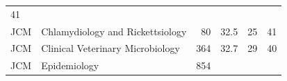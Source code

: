 \documentclass[11pt,]{article}
\begin{document}
\begin{longtable}[]{@{}llrrrr@{}}
\begin{minipage}[t]{0.11\columnwidth}
41\strut
\end{minipage}\tabularnewline
\begin{minipage}[t]{0.06\columnwidth}\raggedright\strut
JCM\strut
\end{minipage} & \begin{minipage}[t]{0.43\columnwidth}\raggedright\strut
Chlamydiology and Rickettsiology\strut
\end{minipage} & \begin{minipage}[t]{0.04\columnwidth}\raggedleft\strut
80\strut
\end{minipage} & \begin{minipage}[t]{0.08\columnwidth}\raggedleft\strut
32.5\strut
\end{minipage} & \begin{minipage}[t]{0.11\columnwidth}\raggedleft\strut
25\strut
\end{minipage} & \begin{minipage}[t]{0.11\columnwidth}\raggedleft\strut
41\strut
\end{minipage}\tabularnewline
\begin{minipage}[t]{0.06\columnwidth}\raggedright\strut
JCM\strut
\end{minipage} & \begin{minipage}[t]{0.43\columnwidth}\raggedright\strut
Clinical Veterinary Microbiology\strut
\end{minipage} & \begin{minipage}[t]{0.04\columnwidth}\raggedleft\strut
364\strut
\end{minipage} & \begin{minipage}[t]{0.08\columnwidth}\raggedleft\strut
32.7\strut
\end{minipage} & \begin{minipage}[t]{0.11\columnwidth}\raggedleft\strut
29\strut
\end{minipage} & \begin{minipage}[t]{0.11\columnwidth}\raggedleft\strut
40\strut
\end{minipage}\tabularnewline
\begin{minipage}[t]{0.06\columnwidth}\raggedright\strut
JCM\strut
\end{minipage} & \begin{minipage}[t]{0.43\columnwidth}\raggedright\strut
Epidemiology\strut
\end{minipage} & \begin{minipage}[t]{0.04\columnwidth}\raggedleft\strut
854\strut
\end{minipage} & \begin{minipage}[t]{0.08\columnwidth}\raggedleft\strut

\end{minipage}
\end{longtable}
\end{document}
